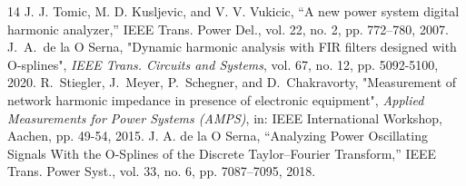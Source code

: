 \documentclass[conference]{IEEEtran}
\begin{document}
\begin{thebibliography}{14}
 J. J. Tomic, M. D. Kusljevic, and V. V. Vukicic, “A new power system digital harmonic analyzer,” IEEE Trans. Power Del., vol. 22, no. 2, pp. 772–780, 2007.
 J.~A.~de la O Serna, "Dynamic harmonic analysis with FIR filters designed with O-splines", \emph{IEEE Trans. Circuits and Systems}, vol. 67, no. 12, pp. 5092-5100, 2020.
 R.~Stiegler, J.~Meyer, P.~Schegner, and D.~Chakravorty, "Measurement of network harmonic impedance in presence of electronic equipment", \emph{Applied Measurements for Power Systems (AMPS)}, in: IEEE International Workshop, Aachen, pp. 49-54, 2015.
 J. A. de la O Serna, “Analyzing Power Oscillating Signals With the O-Splines of the Discrete Taylor–Fourier Transform,” IEEE Trans. Power Syst., vol. 33, no. 6, pp. 7087–7095, 2018.
\end{thebibliography}
\end{document}
